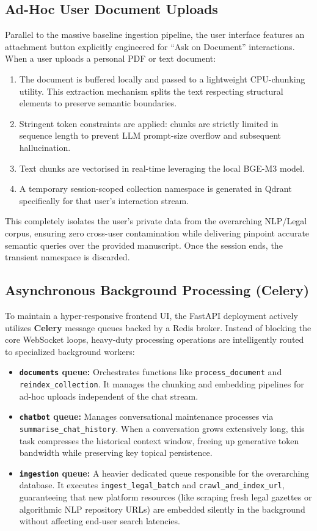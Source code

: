 \documentclass[12pt, a4paper]{article}
\begin{document}
\subsection{Ad-Hoc User Document Uploads}
Parallel to the massive baseline ingestion pipeline, the user interface features an attachment button explicitly engineered for ``Ask on Document'' interactions.
When a user uploads a personal PDF or text document:
\begin{enumerate}[leftmargin=2em]
  \item The document is buffered locally and passed to a lightweight CPU-chunking utility. This extraction mechanism splits the text respecting structural elements to preserve semantic boundaries.
  \item Stringent token constraints are applied: chunks are strictly limited in sequence length to prevent LLM prompt-size overflow and subsequent hallucination.
  \item Text chunks are vectorised in real-time leveraging the local BGE-M3 model.
  \item A temporary session-scoped collection namespace is generated in Qdrant specifically for that user's interaction stream.
\end{enumerate}
This completely isolates the user's private data from the overarching NLP/Legal corpus, ensuring zero cross-user contamination while delivering pinpoint accurate semantic queries over the provided manuscript. Once the session ends, the transient namespace is discarded.

\subsection{Asynchronous Background Processing (Celery)}
To maintain a hyper-responsive frontend UI, the FastAPI deployment actively utilizes \textbf{Celery} message queues backed by a Redis broker. Instead of blocking the core WebSocket loops, heavy-duty processing operations are intelligently routed to specialized background workers:
\begin{itemize}[leftmargin=2em]
  \item \textbf{\texttt{documents} queue:} Orchestrates functions like \texttt{process\_document} and \texttt{reindex\_collection}. It manages the chunking and embedding pipelines for ad-hoc uploads independent of the chat stream.
  \item \textbf{\texttt{chatbot} queue:} Manages conversational maintenance processes via \texttt{summarise\_chat\_history}. When a conversation grows extensively long, this task compresses the historical context window, freeing up generative token bandwidth while preserving key topical persistence.
  \item \textbf{\texttt{ingestion} queue:} A heavier dedicated queue responsible for the overarching database. It executes \texttt{ingest\_legal\_batch} and \texttt{crawl\_and\_index\_url}, guaranteeing that new platform resources (like scraping fresh legal gazettes or algorithmic NLP repository URLs) are embedded silently in the background without affecting end-user search latencies.
\end{itemize}
\end{document}
